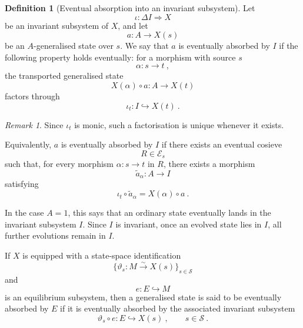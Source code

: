 \documentclass[a4paper,reqno,oneside]{amsart}
\theoremstyle{definition}
\newtheorem{definition}[theorem]{Definition}
\theoremstyle{remark}
\newtheorem{remark}[theorem]{Remark}
\renewcommand{\theta}{\vartheta}
\numberwithin{equation}{section}
\begin{document}
	\begin{definition}[Eventual absorption into an invariant subsystem]
		Let
		\begin{equation}
			\iota\colon \Delta I\Longrightarrow X
		\end{equation}
		be an invariant subsystem of $X$, and let
		\begin{equation}
			a\colon A\to X(s)
		\end{equation}
		be an $A$-generalised state over $s$. We say that $a$ is eventually absorbed by $I$ if the following property holds eventually: for a morphism with source $s$
		\begin{equation}
			\alpha\colon s\to t \ ,
		\end{equation}
		the transported generalised state
		\begin{equation}
			X(\alpha)\circ a\colon A\to X(t)
		\end{equation}
		factors through
		\begin{equation}
			\iota_t\colon I\hookrightarrow X(t) \ .
		\end{equation}
	\end{definition}
	
	\begin{remark}
		Since $\iota_t$ is monic, such a factorisation is unique whenever it exists.
	\end{remark}
	
	Equivalently, $a$ is eventually absorbed by $I$ if there exists an eventual
	cosieve
	\begin{equation}
		R\in\mathcal E_s
	\end{equation}
	such that, for every morphism $\alpha\colon s\to t$ in $R$, there exists a morphism
	\begin{equation}
		\widetilde a_\alpha\colon A\to I
	\end{equation}
	satisfying
	\begin{equation}
		\iota_t\circ \widetilde a_\alpha
		=
		X(\alpha)\circ a \ .
	\end{equation}
	
	In the case $A=1$, this says that an ordinary state eventually lands in the
	invariant subsystem $I$. Since $I$ is invariant, once an evolved state lies
	in $I$, all further evolutions remain in $I$.
	
	If $X$ is equipped with a state-space identification
	\begin{equation}
		\{\theta_s\colon M\xrightarrow{\sim}X(s)\}_{s\in\mathcal S}
	\end{equation}
	and
	\begin{equation}
		e\colon E\hookrightarrow M
	\end{equation}
	is an equilibrium subsystem, then a generalised state is said to be
	eventually absorbed by $E$ if it is eventually absorbed by the associated
	invariant subsystem
	\begin{equation}
		\theta_s\circ e\colon E\hookrightarrow X(s) \ ,
		\qquad s\in\mathcal S \ .
	\end{equation}
	
\end{document}
